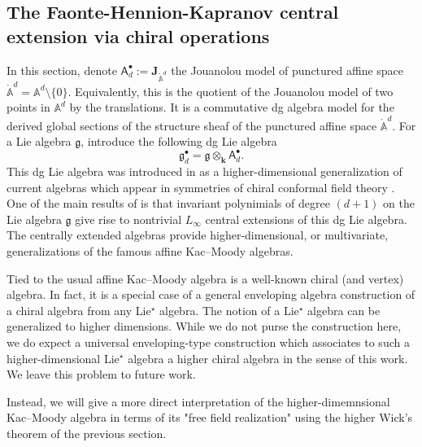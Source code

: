 \documentclass[11pt]{amsart}
\theoremstyle{definition}
\theoremstyle{remark}
\numberwithin{equation}{section}
\newcommand{\bu}{\bullet}
\begin{document}
\subsection{The Faonte-Hennion-Kapranov central extension via chiral operations}

In this section, denote $\mathsf{A}^\bu_d := \mathbf{J}_{\mathring{\mathbb{A}}^d}$ the Jouanolou model of
punctured affine space~$\mathring{\mathbb{A}}^d = \mathbb{A}^d \setminus \{0\}$.
Equivalently, this is the quotient of the Jouanolou model of two points in $\mathbb{A}^d$ by the translations.
It is a commutative dg algebra model for the derived global sections of the structure sheaf of the punctured affine
space $\mathring{\mathbb{A}}^d$.
For a Lie algebra $\mathfrak{g}$, introduce the following dg Lie algebra
$$
\mathfrak{g}^{\bullet}_d=\mathfrak{g}\otimes_{\mathbf{k}} \mathsf{A}_d^{\bullet}.
$$
This dg Lie algebra was introduced in \cite{FHK} as a higher-dimensional generalization of current algebras which
appear in symmetries of chiral conformal field theory \cite{GWkm}.
One of the main results of \cite{FHK} is that invariant polynimials of degree $(d+1)$ on the Lie algebra $\mathfrak{g}$ give
rise to nontrivial $L_\infty$ central extensions of this dg Lie algebra.
The centrally extended algebras provide higher-dimensional, or multivariate, generalizations of the famous affine Kac--Moody algebras. 

Tied to the usual affine Kac--Moody algebra is a well-known chiral (and vertex) algebra.
In fact, it is a special case of a general enveloping algebra construction of a chiral algebra from any Lie$^\star$ algebra.
The notion of a Lie$^\star$ algebra can be generalized to higher dimensions.
While we do not purse the construction here, we do expect a universal enveloping-type construction which associates to
such a higher-dimensional Lie$^\star$ algebra a higher chiral algebra in the sense of this work.
We leave this problem to future work.

Instead, we will give a more direct interpretation of the higher-dimemnsional Kac--Moody algebra in terms of its "free
field realization" using the higher Wick's theorem of the previous section.
\end{document}
